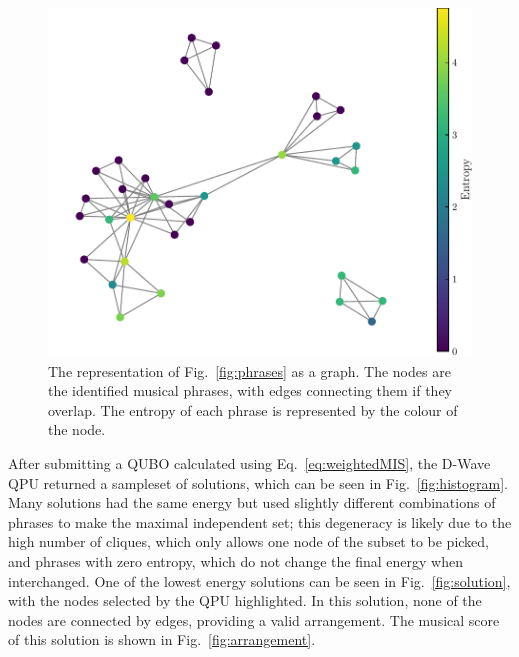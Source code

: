 \documentclass[aps,pra,10pt,twocolumn]{revtex4-2}
\begin{document}
\begin{figure}[h]
    \centering
    \includegraphics[width=\linewidth]{../Figures/problemGraph.pdf}
    \caption{The representation of Fig.\ \ref{fig:phrases} as a graph. The nodes are the identified musical phrases, with edges connecting them if they overlap. The entropy of each phrase is represented by the colour of the node.}
    \label{fig:graph}
\end{figure}

After submitting a QUBO calculated using Eq.\ \ref{eq:weightedMIS}, the D-Wave QPU returned a sampleset of solutions, which can be seen in Fig.\ \ref{fig:histogram}. Many solutions had the same energy but used slightly different combinations of phrases to make the maximal independent set; this degeneracy is likely due to the high number of cliques, which only allows one node of the subset to be picked, and phrases with zero entropy, which do not change the final energy when interchanged. One of the lowest energy solutions can be seen in Fig.\ \ref{fig:solution}, with the nodes selected by the QPU highlighted. In this solution, none of the nodes are connected by edges, providing a valid arrangement. The musical score of this solution is shown in Fig.\ \ref{fig:arrangement}.
\end{document}
